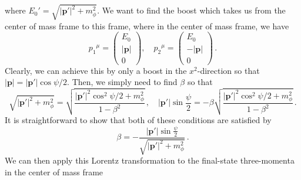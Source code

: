 \documentclass{article}
\numberwithin{equation}{subsection}
\begin{document}
where $E_0' = \sqrt{|\mathbf{p}'|^2 + m_\phi^2}$. We want to find the boost which takes us from the center of mass frame to this frame, 
where in the center of mass frame, we have
\begin{equation}
	{p_1}{}^\mu = \begin{pmatrix}
		E_0\\
		|\mathbf{p}| \\
		0
	\end{pmatrix}, \quad
	{p_2}{}^\mu = \begin{pmatrix}
		E_0\\
		-|\mathbf{p}| \\
		0
	\end{pmatrix}\,.
\end{equation}
Clearly, we can achieve this by only a boost in the $x^2$-direction so that $|\mathbf{p}| = |\mathbf{p}'|\cos\psi/2$. Then, we simply need to find
$\beta$ so that
\begin{equation}
	\sqrt{|\mathbf{p}'|^2 + m_\phi^2} = \sqrt{\frac{|\mathbf{p}'|^2\cos^2\psi/2 + m_\phi^2}{1 - \beta^2}}\,, \quad 
	|\mathbf{p}'|\sin\frac{\psi}{2} = - \beta\sqrt{\frac{|\mathbf{p}'|^2\cos^2\psi/2 + m_\phi^2}{1 - \beta^2}}\,.
\end{equation}
It is straightforward to show that both of these conditions are satisfied by
\begin{equation}
	\beta = -\frac{|\mathbf{p}'|\sin\frac{\psi}{2}}{\sqrt{|\mathbf{p}'|^2 + m_\phi^2}}\,.
\end{equation}
We can then apply this Lorentz transformation to the final-state three-momenta in the center of mass frame
\end{document}
